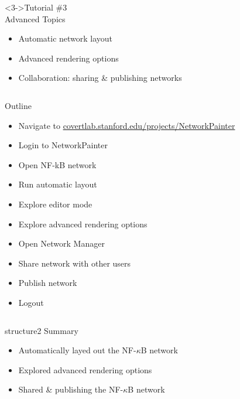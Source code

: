 \documentclass[mathserif]{beamer}
\begin{document}
\begin{frame}
\begin{columns}[t]
\begin{column}{2.1in}
\begin{block}<3->{\small Tutorial \#3\\Advanced Topics}
\scriptsize
\begin{itemize}
\item Automatic network layout
\item Advanced rendering options
\item Collaboration: sharing \& publishing networks
\end{itemize}
\end{block}

\end{column}
\end{columns}
\end{frame}

\begin{frame}{Outline}
\begin{itemize}
\item Navigate to \url{covertlab.stanford.edu/projects/NetworkPainter}
\item Login to NetworkPainter
\item Open NF-kB network
\item Run automatic layout
\item Explore editor mode
\item Explore advanced rendering options
\item Open Network Manager
\item Share network with other users
\item Publish network
\item Logout
\end{itemize}
\end{frame}

\begin{frame}
\begin{columns}
\begin{column}{3.5in}
\begin{center}
\begin{beamercolorbox}[rounded=true,shadow=true,center,sep=0.01cm]{structure2}
\LARGE
Summary
\end{beamercolorbox}
\begin{itemize}
\item Automatically layed out the NF-$\kappa$B network
\item Explored advanced rendering options
\item Shared \& publishing the NF-$\kappa$B network
\end{itemize}
\end{center}
\end{column}
\end{columns}
\end{frame}
\end{document}
